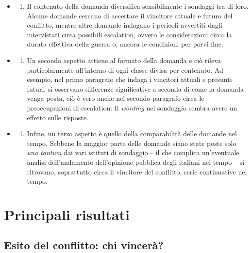 \documentclass[
]{book}
\providecommand{\tightlist}{%
  \setlength{\itemsep}{0pt}\setlength{\parskip}{0pt}}
\begin{document}
\begin{itemize}
\item
  \begin{enumerate}
  \def\labelenumi{\alph{enumi})}
  \tightlist
  \item
    Il contenuto della domanda diversifica sensibilmente i sondaggi tra di loro. Alcune domande cercano di accertare il vincitore attuale e futuro del conflitto, mentre altre domande indagano i pericoli avvertiti dagli intervistati circa possibili escalation, ovvero le considerazioni circa la durata effettiva della guerra o, ancora le condizioni per porvi fine.
  \end{enumerate}
\item
  \begin{enumerate}
  \def\labelenumi{\alph{enumi})}
  \setcounter{enumi}{1}
  \tightlist
  \item
    Un secondo aspetto attiene al formato della domanda e ciò rileva particolarmente all'interno di ogni classe divisa per contenuto. Ad esempio, nel primo paragrafo che indaga i vincitori attuali e presunti futuri, si osservano differenze significative a seconda di come la domanda venga posta, ciò è vero anche nel secondo paragrafo circa le preoccupazioni di escalation: Il \emph{wording} nel sondaggio sembra avere un effetto sulle risposte.
  \end{enumerate}
\item
  \begin{enumerate}
  \def\labelenumi{\alph{enumi})}
  \setcounter{enumi}{2}
  \tightlist
  \item
    Infine, un terzo aspetto è quello della comparabilità delle domande nel tempo. Sebbene la maggior parte delle domande siano state poste solo \emph{una tantum} dai vari istituti di sondaggio -- il che complica un'eventuale analisi dell'andamento dell'opinione pubblica degli italiani nel tempo -- si ritrovano, soprattutto circa il vincitore del conflitto, serie continuative nel tempo.
  \end{enumerate}
\end{itemize}

\hypertarget{principali-risultati-2}{%
\section{Principali risultati}\label{principali-risultati-2}}

\hypertarget{esito-del-conflitto-chi-vinceruxe0}{%
\subsection{Esito del conflitto: chi vincerà?}\label{esito-del-conflitto-chi-vinceruxe0}}
\end{document}
